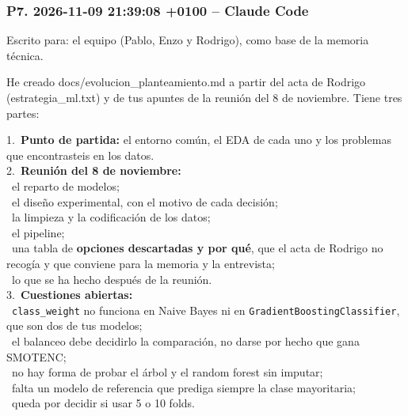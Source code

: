 \documentclass[11pt,a4paper]{article}
\begin{document}
\subsubsection*{P7. 2026-11-09 21:39:08 +0100 -- Claude Code}
{\small
Escrito para: el equipo (Pablo, Enzo y Rodrigo), como base de la memoria técnica.

He creado docs/\allowbreak{}evolucion\_\allowbreak{}planteamiento.md a partir del acta de Rodrigo (estrategia\_\allowbreak{}ml.txt) y de tus apuntes de la reunión del 8 de noviembre. Tiene tres partes:

\hspace*{1.0em}1.~\textbf{Punto de partida:} el entorno común, el EDA de cada uno y los problemas que encontrasteis en los datos. \\{}
\hspace*{1.0em}2.~\textbf{Reunión del 8 de noviembre:} \\{}
\hspace*{2.5em}\textbullet~el reparto de modelos; \\{}
\hspace*{2.5em}\textbullet~el diseño experimental, con el motivo de cada decisión; \\{}
\hspace*{2.5em}\textbullet~la limpieza y la codificación de los datos; \\{}
\hspace*{2.5em}\textbullet~el pipeline; \\{}
\hspace*{2.5em}\textbullet~una tabla de \textbf{opciones descartadas y por qué}, que el acta de Rodrigo no recogía y que conviene para la memoria y la entrevista; \\{}
\hspace*{2.5em}\textbullet~lo que se ha hecho después de la reunión. \\{}
\hspace*{1.0em}3.~\textbf{Cuestiones abiertas:} \\{}
\hspace*{2.5em}\textbullet~\texttt{class\_\allowbreak{}weight} no funciona en Naive Bayes ni en \texttt{GradientBoostingClassifier}, que son dos de tus modelos; \\{}
\hspace*{2.5em}\textbullet~el balanceo debe decidirlo la comparación, no darse por hecho que gana SMOTENC; \\{}
\hspace*{2.5em}\textbullet~no hay forma de probar el árbol y el random forest sin imputar; \\{}
\hspace*{2.5em}\textbullet~falta un modelo de referencia que prediga siempre la clase mayoritaria; \\{}
\hspace*{2.5em}\textbullet~queda por decidir si usar 5 o 10 folds.

}
\end{document}
